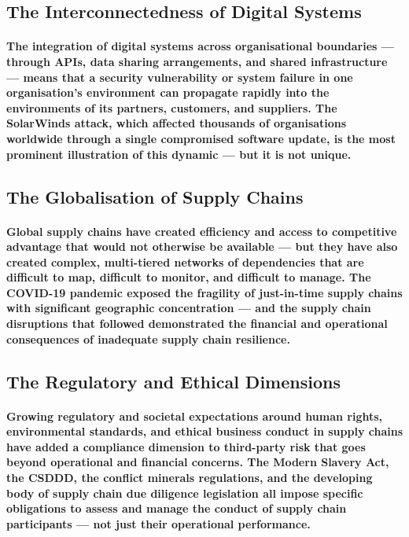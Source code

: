 \subsection{The Interconnectedness of Digital Systems}
\paragraph{The integration of digital systems across organisational boundaries — through APIs, data sharing arrangements, and shared infrastructure — means that a security vulnerability or system failure in one organisation's environment can propagate rapidly into the environments of its partners, customers, and suppliers. The SolarWinds attack, which affected thousands of organisations worldwide through a single compromised software update, is the most prominent illustration of this dynamic — but it is not unique.}

\subsection{The Globalisation of Supply Chains}
\paragraph{Global supply chains have created efficiency and access to competitive advantage that would not otherwise be available — but they have also created complex, multi-tiered networks of dependencies that are difficult to map, difficult to monitor, and difficult to manage. The COVID-19 pandemic exposed the fragility of just-in-time supply chains with significant geographic concentration — and the supply chain disruptions that followed demonstrated the financial and operational consequences of inadequate supply chain resilience.}

\subsection{The Regulatory and Ethical Dimensions}
\paragraph{Growing regulatory and societal expectations around human rights, environmental standards, and ethical business conduct in supply chains have added a compliance dimension to third-party risk that goes beyond operational and financial concerns. The Modern Slavery Act, the CSDDD, the conflict minerals regulations, and the developing body of supply chain due diligence legislation all impose specific obligations to assess and manage the conduct of supply chain participants — not just their operational performance.}

